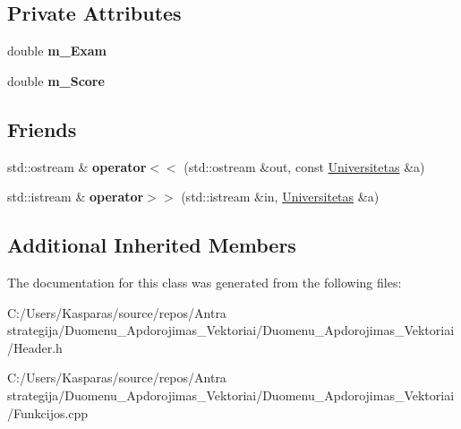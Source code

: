 \subsection*{Private Attributes}
\begin{DoxyCompactItemize}
\item 
\mbox{\label{class_universitetas_a8009d654b719220aa4275061446e96f0}} 
double {\bfseries m\+\_\+\+Exam}
\item 
\mbox{\label{class_universitetas_aa8d6fb09f4854af2f61dc7710930ce1a}} 
double {\bfseries m\+\_\+\+Score}
\end{DoxyCompactItemize}
\subsection*{Friends}
\begin{DoxyCompactItemize}
\item 
\mbox{\label{class_universitetas_abc8a10d928153344d6318dee9d08ac13}} 
std\+::ostream \& {\bfseries operator$<$$<$} (std\+::ostream \&out, const \mbox{\hyperlink{class_universitetas}{Universitetas}} \&a)
\item 
\mbox{\label{class_universitetas_a9e26ab0124d2b63319fd3eb6ad46597d}} 
std\+::istream \& {\bfseries operator$>$$>$} (std\+::istream \&in, \mbox{\hyperlink{class_universitetas}{Universitetas}} \&a)
\end{DoxyCompactItemize}
\subsection*{Additional Inherited Members}


The documentation for this class was generated from the following files\+:\begin{DoxyCompactItemize}
\item 
C\+:/\+Users/\+Kasparas/source/repos/\+Antra strategija/\+Duomenu\+\_\+\+Apdorojimas\+\_\+\+Vektoriai/\+Duomenu\+\_\+\+Apdorojimas\+\_\+\+Vektoriai/Header.\+h\item 
C\+:/\+Users/\+Kasparas/source/repos/\+Antra strategija/\+Duomenu\+\_\+\+Apdorojimas\+\_\+\+Vektoriai/\+Duomenu\+\_\+\+Apdorojimas\+\_\+\+Vektoriai/Funkcijos.\+cpp\end{DoxyCompactItemize}
